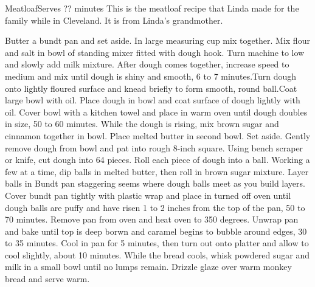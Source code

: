 \begin{recipe}{Meatloaf}{Serves ?}{? minutes}
\freeform This is the meatloaf recipe that Linda made for the family while in Cleveland.  It is from Linda's grandmother.

Butter a bundt pan and set aside.
In large measuring cup mix together.
Mix flour and salt in bowl of standing mixer fitted with dough hook.
\freeform
Turn machine to low and slowly add milk mixture.  After dough comes
together, increase speed to medium and mix until dough is shiny and
smooth, 6 to 7 minutes.Turn dough onto lightly floured surface and
knead briefly to form smooth, round ball.Coat large bowl with
oil. Place dough in bowl and coat surface of dough lightly with oil.
Cover bowl with a kitchen towel and place in warm oven until dough
doubles in size, 50 to 60 minutes.
While the dough is rising, mix brown sugar and cinnamon together in bowl. Place melted butter in second bowl. Set aside.
\freeform
Gently remove dough from bowl and pat into rough 8-inch square. Using
bench scraper or knife, cut dough into 64 pieces. Roll each piece of
dough into a ball. Working a few at a time, dip balls in melted
butter, then roll in brown sugar mixture. Layer balls in Bundt pan
staggering seems where dough balls meet as you build layers. Cover
bundt pan tightly with plastic wrap and place in turned off oven until
dough balls are puffy and have risen 1 to 2 inches from the top of the
pan, 50 to 70 minutes. Remove pan from oven and heat oven to 350
degrees. Unwrap pan and bake until top is deep borwn and caramel
begins to bubble around edges, 30 to 35 minutes. Cool in pan for 5
minutes, then turn out onto platter and allow to cool slightly, about
10 minutes.
While the bread cools, whisk powdered sugar and milk in a small bowl until no lumps remain. Drizzle glaze over warm monkey bread and serve warm. 
\end{recipe}
